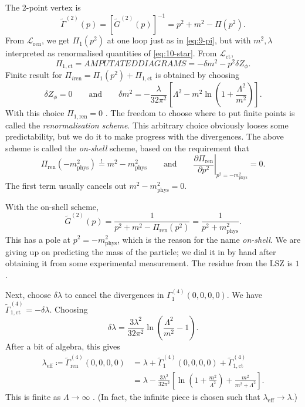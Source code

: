 The 2-point vertex is
\begin{equation}
  \widetilde{\Gamma}^{(2)}(p) = [\widetilde{G}^{(2)}(p)]^{-1} = p^2 + m^2 - \Pi(p^2).
\end{equation}
From $\mathscr{L}_{\text{ren}}$, we get $\Pi_1(p^2)$ at one loop just as in \eqref{eq:9-pi}, but with $m^2, \lambda$ interpreted as renormalised quantities of \eqref{eq:10-star}.
From $\mathscr{L}_{\text{ct}}$, 
\begin{equation}
  \Pi_{1, \text{ct}} = AMPUTATED DIAGRAMS = - \delta m^2 - p^2 \delta Z_\phi.
\end{equation}
Finite result for $\Pi_{i \text{ren}} = \Pi_1(p^2) + \Pi_{1, \text{ct}}$  is obtained by choosing
 \begin{equation}
  \delta Z_\phi = 0 \qquad \text{and} \qquad \delta m^2 = -\frac{\lambda}{32 \pi^2} \left[ \Lambda^2 - m^2 \ln(1 + \frac{\Lambda^2}{m^2}) \right].
\end{equation}
With this choice $\Pi_{1, \text{ren}} = 0$ .
The freedom to choose where to put finite points is called the \emph{renormalisation scheme}.
This arbitrary choice obviously looses some predictability, but we do it to make progress with the divergences.
The above scheme is called the \emph{on-shell} scheme, based on the requirement that
\begin{equation}
  \Pi_{\text{ren}}(-m^2_{\text{phys}}) \stackrel{!}{=} m^2 - m^2_{\text{phys}} \qquad \text{and} \qquad
  \left.\frac{\partial \Pi_{\text{ren}}}{\partial p^2}\right\rvert_{p^2 = -m^2_{\text{phys}}} = 0.
\end{equation}
The first term usually cancels out $m^2 - m^2_{\text{phys}} = 0$.

With the on-shell scheme, 
\begin{equation}
  \widetilde{G}^{(2)}(p) = \frac{1}{p^2+ m^2 - \Pi_{\text{ren}}(p^2)} = \frac{1}{p^2 + m^2_{\text{phys}}}.
\end{equation}
This has a pole at $p^2 = -m^2_{\text{phys}}$, which is the reason for the name \emph{on-shell}.
We are giving up on predicting the mass of the particle; we dial it in by hand after obtaining it from some experimental measurement.
The residue from the LSZ is $1$.

Next, choose $\delta \lambda$ to cancel the divergences in $\Gamma_1^{(4)}(0,0,0,0)$.
We have $\widetilde\Gamma_{1, \text{ct}}^{(4)} = -\delta \lambda$. Choosing
\begin{equation}
  \delta \lambda = \frac{3 \lambda^2}{32 \pi^2} \ln(\frac{\Lambda^2}{m^2} - 1).
\end{equation}
After a bit of algebra, this gives
\begin{align}
  \lambda_{\text{eff}} \coloneqq \widetilde{\Gamma}_{\text{ren}}^{(4)}(0,0,0,0) &= \lambda + \widetilde{\Gamma}_1^{(4)}(0,0,0,0) + \widetilde{\Gamma}_{1, \text{ct}}^{(4)} \\
										&= \lambda - \frac{3\lambda^2}{32 \pi^2} \left[ \ln(1 + \frac{m^2}{\Lambda^2}) + \frac{m^2}{m^2 + \Lambda^2} \right].
\end{align}
This is finite as $\Lambda \to \infty$ . (In fact, the infinite piece is chosen such that $\lambda_{\text{eff}} \to \lambda$.)

